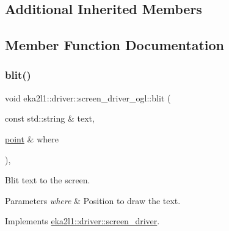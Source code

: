 \subsection*{Additional Inherited Members}


\subsection{Member Function Documentation}
\mbox{\label{classeka2l1_1_1driver_1_1screen__driver__ogl_ad1516779373ac8f97c42cc3dddf6cab1}} 
\subsubsection{\texorpdfstring{blit()}{blit()}}
{\footnotesize\ttfamily void eka2l1\+::driver\+::screen\+\_\+driver\+\_\+ogl\+::blit (\begin{DoxyParamCaption}\item[{const std\+::string \&}]{text,  }\item[{\mbox{\hyperlink{structeka2l1_1_1vec2}{point}} \&}]{where }\end{DoxyParamCaption})\hspace{0.3cm}{\ttfamily [override]}, {\ttfamily [virtual]}}



Blit text to the screen. 


\begin{DoxyParams}{Parameters}
{\em where} & Position to draw the text. \\
\hline
\end{DoxyParams}


Implements \mbox{\hyperlink{classeka2l1_1_1driver_1_1screen__driver_a8517ad66ef54e263f3ce38ac5fb34347}{eka2l1\+::driver\+::screen\+\_\+driver}}.

\mbox{\label{classeka2l1_1_1driver_1_1screen__driver__ogl_a876d4f6acd98260c192c5b5a1f39d5f8}} 
